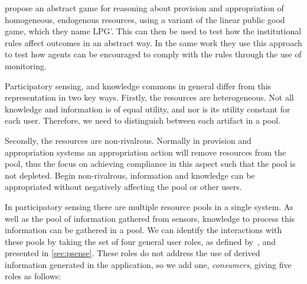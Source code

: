 \citet{Pitt2012c} propose an abstract game for reasoning about provision and
appropriation of homogeneous, endogenous resources, using a variant of the
linear public good game, which they name LPG'. This can then be used to test
how the institutional rules affect outcomes in an abstract way. In the same
work they use this approach to test how agents can be encouraged to comply
with the rules through the use of monitoring.

Participatory sensing, and knowledge commons in general differ from this
representation in two key ways. Firstly, the resources are heterogeneous. Not
all knowledge and information is of equal utility, and nor is its utility
constant for each user. Therefore, we need to distinguish between each
artifact in a pool.

Secondly, the resources are non-rivalrous. Normally in provision and
appropriation systems an appropriation action will remove resources from the
pool, thus the focus on achieving compliance in this aspect such that the pool
is not depleted. Begin non-rivalrous, information and knowledge can be
appropriated without negatively affecting the pool or other users.

In participatory sensing there are multiple resource pools in a single system.
As well as the pool of information gathered from sensors, knowledge to process
this information can be gathered in a pool. We can identify the interactions
with these pools by taking the set of four general user roles, as defined
by~, and presented in \autoref{sec:psense}. These roles
do not address the use of derived information generated in the application, so
we add one, \emph{consumers}, giving five roles as follows:

